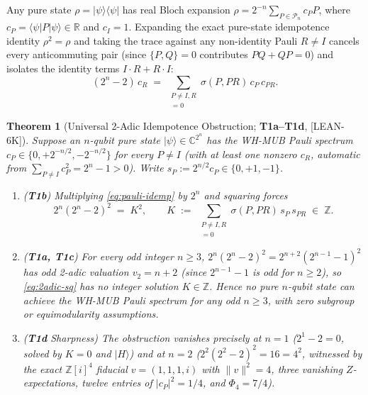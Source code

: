 \documentclass[11pt,reqno]{amsart}
\newtheorem{theorem}{Theorem}[section]
\theoremstyle{definition}
\newcommand{\Z}{\mathbb{Z}}
\newcommand{\C}{\mathbb{C}}
\newcommand{\R}{\mathbb{R}}
\newcommand{\taglean}{\textsf{[LEAN-6K]}}
\begin{document}
Any pure state $\rho=|\psi\rangle\langle\psi|$ has real Bloch expansion
$\rho = 2^{-n}\sum_{P\in\mathcal{P}_n} c_P P$, where $c_P=\langle\psi|P|\psi\rangle\in\R$
and $c_I=1$. Expanding the exact pure-state idempotence identity $\rho^2=\rho$ and taking
the trace against any non-identity Pauli $R\neq I$ cancels every anticommuting pair
(since $\{P,Q\}=0$ contributes $PQ+QP=0$) and isolates the identity terms $I\cdot R + R\cdot I$:
\begin{equation}\label{eq:pauli-idemp}
  (2^n - 2)\, c_R
  \;=\;
  \sum_{\substack{P\neq I,R \\ [P,R]=0}} \sigma(P,PR)\, c_P\, c_{PR}.
\end{equation}

\begin{theorem}[Universal 2-Adic Idempotence Obstruction; \textbf{T1a--T1d}, \taglean]\label{thm:p1}
Suppose an $n$-qubit pure state $|\psi\rangle\in\C^{2^n}$ has the WH-MUB Pauli spectrum
$c_P\in\{0,+2^{-n/2},-2^{-n/2}\}$ for every $P\neq I$ (with at least one nonzero $c_R$,
automatic from $\sum_{P\neq I}c_P^2=2^n-1>0$). Write $s_P:=2^{n/2}c_P\in\{0,+1,-1\}$.
\begin{enumerate}[leftmargin=1.8em]
  \item \emph{(\textbf{T1b})} Multiplying \eqref{eq:pauli-idemp} by $2^n$ and squaring forces
  \begin{equation}\label{eq:2adic-sq}
    2^n (2^n - 2)^2 \;=\; K^2,
    \qquad
    K \;:=\; \sum_{\substack{P\neq I,R \\ [P,R]=0}} \sigma(P,PR)\, s_P\, s_{PR} \;\in\; \Z.
  \end{equation}
  \item \emph{(\textbf{T1a, T1c})} For every odd integer $n\ge 3$, $2^n(2^n-2)^2=2^{n+2}(2^{n-1}-1)^2$
  has odd 2-adic valuation $v_2=n+2$ (since $2^{n-1}-1$ is odd for $n\ge 2$), so \eqref{eq:2adic-sq}
  has no integer solution $K\in\Z$. Hence no pure $n$-qubit state can achieve the WH-MUB Pauli
  spectrum for any odd $n\ge 3$, with zero subgroup or equimodularity assumptions.
  \item \emph{(\textbf{T1d} Sharpness)} The obstruction vanishes precisely at $n=1$
  ($2^1-2=0$, solved by $K=0$ and $|H\rangle$) and at $n=2$ ($2^2(2^2-2)^2=16=4^2$,
  witnessed by the exact $\Z[i]^4$ fiducial $v=(1,1,1,i)$ with $\|v\|^2=4$, three vanishing
  $Z$-expectations, twelve entries of $|c_P|^2=1/4$, and $\Phi_4=7/4$).
\end{enumerate}
\end{theorem}
\end{document}

